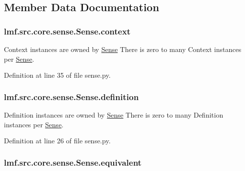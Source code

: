 \subsection{Member Data Documentation}
\hypertarget{classlmf_1_1src_1_1core_1_1sense_1_1_sense_ae2b3da0233748116d4415cc107b6e4c2}{
\subsubsection[{context}]{\setlength{\rightskip}{0pt plus 5cm}lmf.\+src.\+core.\+sense.\+Sense.\+context}}\label{classlmf_1_1src_1_1core_1_1sense_1_1_sense_ae2b3da0233748116d4415cc107b6e4c2}


Context instances are owned by \hyperlink{classlmf_1_1src_1_1core_1_1sense_1_1_sense}{Sense} There is zero to many Context instances per \hyperlink{classlmf_1_1src_1_1core_1_1sense_1_1_sense}{Sense}. 



Definition at line 35 of file sense.\+py.

\hypertarget{classlmf_1_1src_1_1core_1_1sense_1_1_sense_a9adfd8936ecd6626cba82193e068e09e}{
\subsubsection[{definition}]{\setlength{\rightskip}{0pt plus 5cm}lmf.\+src.\+core.\+sense.\+Sense.\+definition}}\label{classlmf_1_1src_1_1core_1_1sense_1_1_sense_a9adfd8936ecd6626cba82193e068e09e}


Definition instances are owned by \hyperlink{classlmf_1_1src_1_1core_1_1sense_1_1_sense}{Sense} There is zero to many Definition instances per \hyperlink{classlmf_1_1src_1_1core_1_1sense_1_1_sense}{Sense}. 



Definition at line 26 of file sense.\+py.

\hypertarget{classlmf_1_1src_1_1core_1_1sense_1_1_sense_a94d3b05f734fbe8898902ae948d30ce5}{
\subsubsection[{equivalent}]{\setlength{\rightskip}{0pt plus 5cm}lmf.\+src.\+core.\+sense.\+Sense.\+equivalent}}\label{classlmf_1_1src_1_1core_1_1sense_1_1_sense_a94d3b05f734fbe8898902ae948d30ce5}


